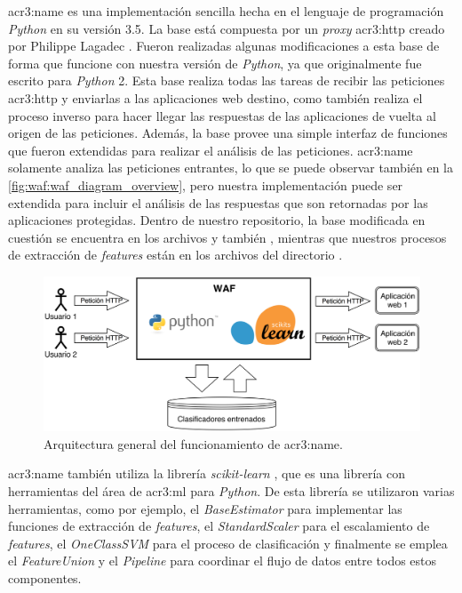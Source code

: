 \gls{acr3:name} es una implementación sencilla hecha en el lenguaje
de programación \textit{Python} en su versión 3.5.
La base está compuesta por un \textit{proxy} \gls{acr3:http} creado por
Philippe Lagadec \citep{cherryproxy2011}. Fueron realizadas algunas
modificaciones a esta base de forma que funcione con nuestra versión de
\textit{Python}, ya que originalmente fue escrito para \textit{Python} 2.
Esta base realiza todas las tareas de recibir las peticiones \gls{acr3:http}
y enviarlas a las aplicaciones web destino, como también realiza el proceso
inverso para hacer llegar las respuestas de las aplicaciones de vuelta
al origen de las peticiones. Además, la base provee una simple interfaz
de funciones que fueron extendidas para realizar el análisis de las
peticiones.
\gls{acr3:name} solamente analiza las peticiones entrantes, lo que se puede
observar también en la \autoref{fig:waf:waf_diagram_overview}, pero nuestra
implementación puede ser extendida para incluir el análisis de las respuestas
que son retornadas por las aplicaciones protegidas.
Dentro de nuestro repositorio, la base modificada en cuestión se encuentra en
los archivos  y también ,
mientras que nuestros procesos de extracción de \textit{features} están
en los archivos del directorio .

\begin{figure}[ht]
    \centering
    \includegraphics[width=\linewidth]{images/waf-diagram-overview.png}

    \caption{Arquitectura general del funcionamiento de \gls{acr3:name}.}
    \label{fig:waf:waf_diagram_overview}
\end{figure}

\gls{acr3:name} también utiliza la librería \textit{scikit-learn}
\citep{scikit-learn}, que es una librería con herramientas del área de
\gls{acr3:ml} para \textit{Python}. De esta librería se utilizaron varias
herramientas, como por ejemplo, el \textit{BaseEstimator} para implementar
las funciones de extracción de \textit{features}, el \textit{StandardScaler}
para el escalamiento de \textit{features}, el \textit{OneClassSVM} para
el proceso de clasificación y finalmente se emplea el \textit{FeatureUnion}
y el \textit{Pipeline} para coordinar el flujo de datos entre todos estos
componentes.


